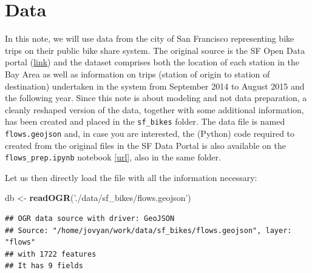 \documentclass[]{book}
\newenvironment{Shaded}{\begin{snugshade}}{\end{snugshade}}
\newcommand{\KeywordTok}[1]{\textcolor[rgb]{0.13,0.29,0.53}{\textbf{#1}}}
\newcommand{\NormalTok}[1]{#1}
\newcommand{\OperatorTok}[1]{\textcolor[rgb]{0.81,0.36,0.00}{\textbf{#1}}}
\newcommand{\OtherTok}[1]{\textcolor[rgb]{0.56,0.35,0.01}{#1}}
\newcommand{\StringTok}[1]{\textcolor[rgb]{0.31,0.60,0.02}{#1}}
\begin{document}
\hypertarget{data-1}{%
\section{Data}\label{data-1}}

In this note, we will use data from the city of San Francisco representing bike trips on their public bike share system. The original source is the SF Open Data portal (\href{http://www.bayareabikeshare.com/open-data}{link}) and the dataset comprises both the location of each station in the Bay Area as well as information on trips (station of origin to station of destination) undertaken in the system from September 2014 to August 2015 and the following year. Since this note is about modeling and not data preparation, a cleanly reshaped version of the data, together with some additional information, has been created and placed in the \texttt{sf\_bikes} folder. The data file is named \texttt{flows.geojson} and, in case you are interested, the (Python) code required to created from the original files in the SF Data Portal is also available on the \texttt{flows\_prep.ipynb} notebook \href{https://github.com/darribas/spa_notes/blob/master/sf_bikes/flows_prep.ipynb}{{[}url{]}}, also in the same folder.

Let us then directly load the file with all the information necessary:

\begin{Shaded}
\begin{Highlighting}[]
\NormalTok{db <-}\StringTok{ }\KeywordTok{readOGR}\NormalTok{(}\StringTok{'./data/sf_bikes/flows.geojson'}\NormalTok{)}
\end{Highlighting}
\end{Shaded}

\begin{verbatim}
## OGR data source with driver: GeoJSON 
## Source: "/home/jovyan/work/data/sf_bikes/flows.geojson", layer: "flows"
## with 1722 features
## It has 9 fields
\end{verbatim}

\begin{Shaded}
\end{Shaded}
\end{document}
